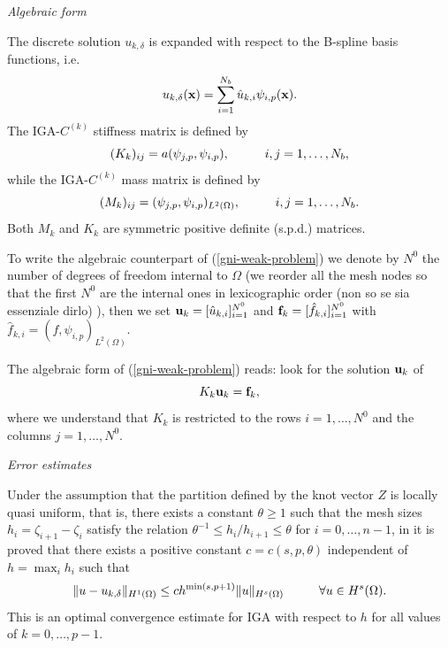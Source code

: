 \documentclass[11pt]{article}
\newcommand{\pg}{\color{red}}
\newcommand{\ld}{\color{green}}
\begin{document}
\null
\emph{Algebraic form}

The discrete solution $u_{k,\delta}$ is expanded with respect to the B-spline 
basis functions, i.e.
\begin{equation}\label{iga-u-expansion}
u_{k,\delta}({\bf x})=\sum_{i=1}^{N_b}\hat u_{k,i} \psi_{i,p}({\bf x}).
\end{equation}
The IGA-$C^{(k)}$ stiffness matrix is defined by
\begin{equation}\label{stiff_iga}
(K_{k})_{ij}=a(\psi_{j,p},\psi_{i,p}), \hskip 1.cm i,j=1,\ldots, N_b,
\end{equation}
while the IGA-$C^{(k)}$ mass matrix is defined by
\begin{equation}\label{mass_iga}
(M_{k})_{ij}=(\psi_{j,p},\psi_{i,p})_{L^2(\Omega)}, \hskip 1.cm i,j=1,\ldots, N_b.
\end{equation}
Both $M_{k}$ and  $K_{k}$ are symmetric positive definite (s.p.d.)
matrices.

To write the algebraic counterpart of (\ref{gni-weak-problem})
we denote by $N^0$ the number of
degrees of freedom internal to $\Omega$ (we reorder all the mesh nodes
 so that
the first $N^0$ are the internal ones {\ld in lexicographic order} {\pg (non 
so se sia essenziale dirlo)} ), then we set
${\bf u}_{k}=[\hat u_{k,i}]_{i=1}^{N^0}$ and
${\bf f}_{k}=[\hat f_{k,i}]_{i=1}^{N^0}$ with 
$\hat f_{k,i}=(f,\psi_{i,p})_{L^2(\Omega)}.$

The algebraic form of (\ref{gni-weak-problem}) reads: look for  the solution
${\bf u}_{k}$ of
\begin{equation}\label{algebraic_iga}
K_{k}{\bf u}_{k}={\bf f}_{k},
\end{equation}
where we understand that $K_{k}$ is
restricted to the rows $i=1,\ldots, N^0$ and the columns $j=1,\ldots, N^0$.

\null
\emph{Error estimates}

Under the assumption that the partition defined by
 the knot vector $Z$ is locally quasi uniform, that is, there exists  a
constant $\theta\geq 1$ such that the mesh sizes $h_i=\zeta_{i+1}-\zeta_i$
satisfy the relation $\theta^{-1}\leq h_i/h_{i+1}\leq \theta$ for $i=0,\ldots,
n-1$, in \cite[Thm. 3.4]{bbsv} it is proved that
there exists a positive constant $c=c(s,p,\theta)$ independent of $h
=\max_i h_i$ such that
\begin{equation}\label{stima_h_iga}
\|u-u_{k,\delta}\|_{H^1(\Omega)}\leq c h^{\min(s,p+1)}\|u\|_{H^s(\Omega)}
\hskip 1.cm \forall u\in H^s(\Omega).
\end{equation}
This is an optimal convergence estimate for IGA with respect to $h$ for
all values of $k=0,\ldots,p-1$.
\end{document}
